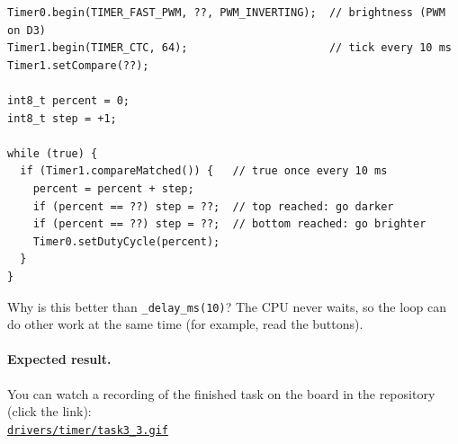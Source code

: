 \documentclass[11pt,a4paper]{article}
\newcommand{\code}[1]{\texttt{#1}}
\begin{document}
\begin{lstlisting}
Timer0.begin(TIMER_FAST_PWM, ??, PWM_INVERTING);  // brightness (PWM on D3)
Timer1.begin(TIMER_CTC, 64);                      // tick every 10 ms
Timer1.setCompare(??);

int8_t percent = 0;
int8_t step = +1;

while (true) {
  if (Timer1.compareMatched()) {   // true once every 10 ms
    percent = percent + step;
    if (percent == ??) step = ??;  // top reached: go darker
    if (percent == ??) step = ??;  // bottom reached: go brighter
    Timer0.setDutyCycle(percent);
  }
}
\end{lstlisting}
Why is this better than \code{\_delay\_ms(10)}? The CPU never waits, so the
loop can do other work at the same time (for example, read the buttons).

\paragraph{Expected result.} You can watch a recording of the finished task on
the board in the repository (click the link):\\
\href{https://github.com/AliSahafi/ATMEGA32A/blob/main/drivers/timer/task3_3.gif}{\code{drivers/timer/task3\_3.gif}}
\end{document}
